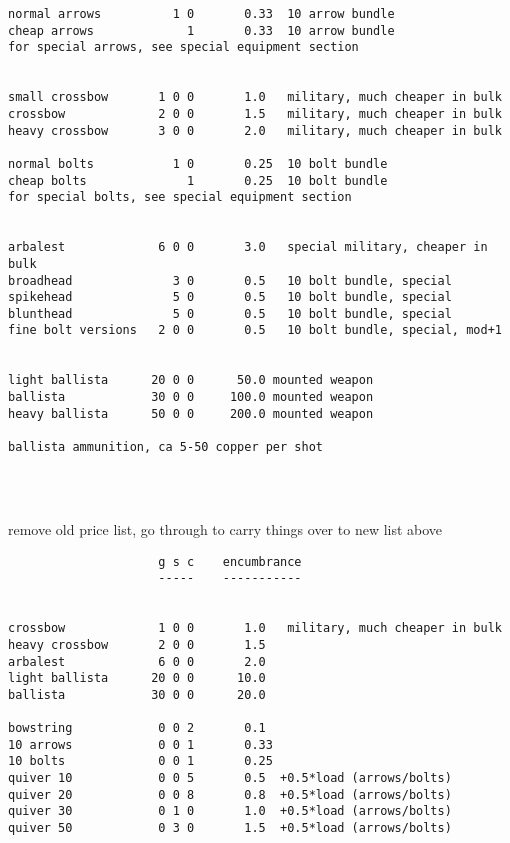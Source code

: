 \begin{verbatim}
normal arrows          1 0       0.33  10 arrow bundle
cheap arrows             1       0.33  10 arrow bundle
for special arrows, see special equipment section


small crossbow       1 0 0       1.0   military, much cheaper in bulk
crossbow             2 0 0       1.5   military, much cheaper in bulk
heavy crossbow       3 0 0       2.0   military, much cheaper in bulk

normal bolts           1 0       0.25  10 bolt bundle
cheap bolts              1       0.25  10 bolt bundle
for special bolts, see special equipment section


arbalest             6 0 0       3.0   special military, cheaper in bulk
broadhead              3 0       0.5   10 bolt bundle, special
spikehead              5 0       0.5   10 bolt bundle, special
blunthead              5 0       0.5   10 bolt bundle, special
fine bolt versions   2 0 0       0.5   10 bolt bundle, special, mod+1


light ballista      20 0 0      50.0 mounted weapon
ballista            30 0 0     100.0 mounted weapon
heavy ballista      50 0 0     200.0 mounted weapon

ballista ammunition, ca 5-50 copper per shot


\end{verbatim} \normalsize

\

\TODO remove old price list, go through to carry things over to new list above


\small \begin{verbatim}
                     g s c    encumbrance
                     -----    -----------


crossbow             1 0 0       1.0   military, much cheaper in bulk
heavy crossbow       2 0 0       1.5
arbalest             6 0 0       2.0
light ballista      20 0 0      10.0
ballista            30 0 0      20.0

bowstring            0 0 2       0.1
10 arrows            0 0 1       0.33
10 bolts             0 0 1       0.25
quiver 10            0 0 5       0.5  +0.5*load (arrows/bolts)
quiver 20            0 0 8       0.8  +0.5*load (arrows/bolts)
quiver 30            0 1 0       1.0  +0.5*load (arrows/bolts)
quiver 50            0 3 0       1.5  +0.5*load (arrows/bolts)

\end{verbatim} \normalsize
\goodbreak





